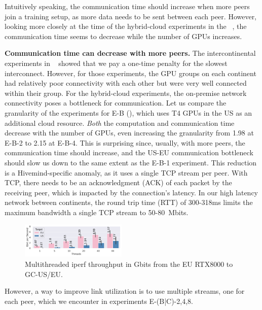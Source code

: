 Intuitively speaking, the communication time should increase when more peers join a training setup, as more data needs to be sent between each peer.
However, looking more closely at the time of the hybrid-cloud experiments in the ~, the communication time seems to decrease while the number of GPUs increases.

\textbf{Communication time can decrease with more peers.} The intercontinental experiments in ~ showed that we pay a one-time penalty for the slowest interconnect.
However, for those experiments, the GPU groups on each continent had relatively poor connectivity with each other but were very well connected within their group.
For the hybrid-cloud experiments, the on-premise network connectivity poses a bottleneck for communication.
Let us compare the granularity of the experiments for E-B (), which uses T4 GPUs in the US as an additional cloud resource.
\textit{Both} the computation and communication time decrease with the number of GPUs, even increasing the granularity from 1.98 at E-B-2 to 2.15 at E-B-4.
This is surprising since, usually, with more peers, the communication time should increase, and the US-EU communication bottleneck should slow us down to the same extent as the E-B-1 experiment.
This reduction is a Hivemind-specific anomaly, as it uses a single TCP stream per peer.
With TCP, there needs to be an acknowledgment (ACK) of each packet by the receiving peer, which is impacted by the connection's latency.
In our high latency network between continents, the round trip time (RTT) of 300-318ms limits the maximum bandwidth a single TCP stream to 50-80~Mbits.
\begin{figure}
    \includegraphics[width=0.45\textwidth]{figures/misc/multi-threaded-iperf-eu-us}
    \vspace{-15pt}
    \caption{Multithreaded iperf throughput in Gbits from the EU RTX8000 to GC-US/EU.}
    \label{fig:multi-threaded-iperf-eu-us}
    \vspace*{-6mm}
\end{figure} 
However, a way to improve link utilization is to use multiple streams, one for each peer, which we encounter in experiments E-(B|C)-2,4,8.

